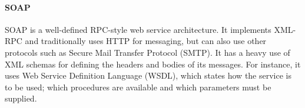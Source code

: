 \paragraph{SOAP}
SOAP is a well-defined RPC-style web service architecture.
It implements XML-RPC and traditionally uses HTTP for messaging, but can also use other protocols such as Secure Mail Transfer Protocol (SMTP).
It has a heavy use of XML schemas for defining the headers and bodies of its messages.
For instance, it uses Web Service Definition Language (WSDL), which states how the service is to be used; which procedures are available and which parameters must be supplied.
